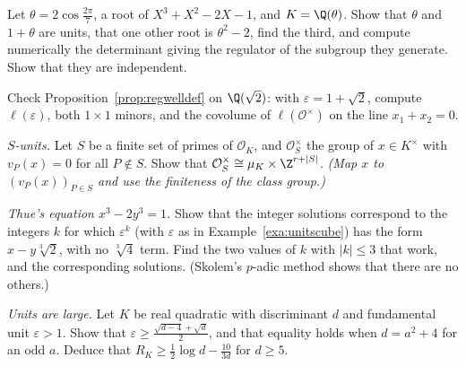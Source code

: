 \begin{exercise}[$\star\star$]\label{ex:cyclic7}
Let $\theta=2\cos\frac{2\pi}7$, a root of $X^3+X^2-2X-1$, and $K=\Q(\theta)$. Show that $\theta$ and $1+\theta$ are units, that
one other root is $\theta^2-2$, find the third, and compute numerically the determinant giving the
regulator of the subgroup they generate. Show that they are independent.
\end{exercise}

\begin{exercise}[$\star\star$]\label{ex:regcol}
Check Proposition~\ref{prop:regwelldef} on $\Q(\sqrt2)$: with $\varepsilon=1+\sqrt2$, compute $\ell(\varepsilon)$, both
$1\times1$ minors, and the covolume of $\ell(\mathcal O^\times)$ on the line $x_1+x_2=0$.
\end{exercise}

\begin{exercise}[$\star\star$]\label{ex:sunits}
\emph{$S$-units.} Let $S$ be a finite set of primes of $\mathcal O_K$, and $\mathcal O_S^\times$ the group of $x\in K^\times$ with
$v_P(x)=0$ for all $P\notin S$. Show that $\mathcal O_S^\times\cong\mu_K\times\Z^{r+|S|}$. \emph{(Map $x$ to $(v_P(x))_{P\in S}$
and use the finiteness of the class group.)}
\end{exercise}

\begin{exercise}[$\star\star$]\label{ex:thue}
\emph{Thue's equation $x^3-2y^3=1$.} Show that the integer solutions correspond to the integers $k$ for which
$\varepsilon^{k}$ (with $\varepsilon$ as in Example~\ref{exa:unitscube}) has the form $x-y\sqrt[3]2$, with no $\sqrt[3]4$
term. Find the two values of $k$ with $|k|\le3$ that work, and the corresponding solutions. (Skolem's $p$-adic method shows that there are no others.)
\end{exercise}

\begin{exercise}[$\star\star\star$]\label{ex:unitbound}
\emph{Units are large.} Let $K$ be real quadratic with discriminant $d$ and fundamental unit $\varepsilon>1$. Show that
$\varepsilon\ge\frac{\sqrt{d-4}+\sqrt d}2$, and that equality holds when $d=a^2+4$ for an odd $a$. Deduce that
$R_K\ge\frac12\log d-\frac{10}{3d}$ for $d\ge5$.
\end{exercise}

